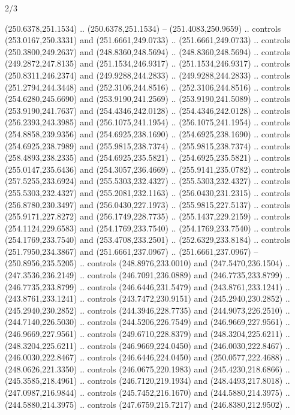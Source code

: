 \begin{flagdescription}{2/3}
\begin{scope}[xshift=0.5\flaglength,yshift=0.5\flagwidth,scale=\flagwidth/318.91]
\begin{scope}[y=0.8pt, x=0.8pt, yscale=-1,shift={(-298.97,-199.32)}]
  (250.6378,251.1534) .. (250.6378,251.1534) -- (251.4083,250.9659) .. controls
  (253.0167,250.3331) and (251.6661,249.0733) .. (251.6661,249.0733) .. controls
  (250.3800,249.2637) and (248.8360,248.5694) .. (248.8360,248.5694) .. controls
  (249.2872,247.8135) and (251.1534,246.9317) .. (251.1534,246.9317) .. controls
  (250.8311,246.2374) and (249.9288,244.2833) .. (249.9288,244.2833) .. controls
  (251.2794,244.3448) and (252.3106,244.8516) .. (252.3106,244.8516) .. controls
  (254.6280,245.6690) and (253.9190,241.2569) .. (253.9190,241.5089) .. controls
  (253.9190,241.7637) and (254.4346,242.0128) .. (254.4346,242.0128) .. controls
  (256.2393,243.3985) and (256.1075,241.1954) .. (256.1075,241.1954) .. controls
  (254.8858,239.9356) and (254.6925,238.1690) .. (254.6925,238.1690) .. controls
  (254.6925,238.7989) and (255.9815,238.7374) .. (255.9815,238.7374) .. controls
  (258.4893,238.2335) and (254.6925,235.5821) .. (254.6925,235.5821) .. controls
  (255.0147,235.6436) and (254.3057,236.4669) .. (255.9141,235.0782) .. controls
  (257.5255,233.6924) and (255.5303,232.4327) .. (255.5303,232.4327) .. controls
  (255.5303,232.4327) and (255.2081,232.1163) .. (256.0430,231.2315) .. controls
  (256.8780,230.3497) and (256.0430,227.1973) .. (255.9815,227.5137) .. controls
  (255.9171,227.8272) and (256.1749,228.7735) .. (255.1437,229.2159) .. controls
  (254.1124,229.6583) and (254.1769,233.7540) .. (254.1769,233.7540) .. controls
  (254.1769,233.7540) and (253.4708,233.2501) .. (252.6329,233.8184) .. controls
  (251.7950,234.3867) and (251.6661,237.0967) .. (251.6661,237.0967) --
  (250.8956,235.5205) .. controls (248.8976,233.0010) and (247.5470,236.1504) ..
  (247.3536,236.2149) .. controls (246.7091,236.0889) and (246.7735,233.8799) ..
  (246.7735,233.8799) .. controls (246.6446,231.5479) and (243.8761,233.1241) ..
  (243.8761,233.1241) .. controls (243.7472,230.9151) and (245.2940,230.2852) ..
  (245.2940,230.2852) .. controls (244.3946,228.7735) and (244.9073,226.2510) ..
  (244.7140,226.5030) .. controls (244.5206,226.7549) and (246.9669,227.9561) ..
  (246.9669,227.9561) .. controls (249.6710,228.8379) and (248.3204,225.6211) ..
  (248.3204,225.6211) .. controls (246.9669,224.0450) and (246.0030,222.8467) ..
  (246.0030,222.8467) .. controls (246.6446,224.0450) and (250.0577,222.4688) ..
  (248.0626,221.3350) .. controls (246.0675,220.1983) and (245.4230,218.6866) ..
  (245.3585,218.4961) .. controls (246.7120,219.1934) and (248.4493,217.8018) ..
  (247.0987,216.9844) .. controls (245.7452,216.1670) and (244.5880,214.3975) ..
  (244.5880,214.3975) .. controls (247.6759,215.7217) and (246.8380,212.9502) ..

\end{scope}
\end{scope}
\end{flagdescription}
